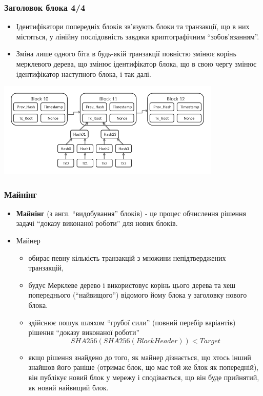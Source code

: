 \documentclass{beamer}
\begin{document}
\begin{frame}
  \frametitle{Заголовок блока 4/4}
  \begin{itemize}
  \item Ідентифікатори попередніх блоків зв'язують блоки та транзакції, що в них
    містяться, у лінійну послідовність завдяки криптографічним ``зобов'язанням''.
  \item Зміна лише одного біта в будь-якій транзакції повністю змінює корінь
    мерклевого дерева, що змінює ідентифікатор блока, що в свою чергу змінює
    ідентифікатор наступного блока, і так далі.
  \end{itemize}
  \begin{center}
    \includegraphics[width=0.8\textwidth]{block-chain}
  \end{center}
\end{frame}

\begin{frame}
  \frametitle{Майнінг}
  \begin{small}
    \begin{itemize}
    \item \textbf{Майнінг} (з англ. ``видобування'' блоків) - це процес обчислення
      рішення задачі ``доказу виконаної роботи'' для нових блоків.
    \item Майнер
      \begin{itemize}
      \item обирає певну кількість транзакцій з множини непідтверджених транзакцій,
      \item будує Мерклеве дерево і використовує корінь цього дерева та хеш
        попереднього (``найвищого'') відомого йому блока у заголовку нового блока.
      \item здійснює пошук шляхом ``грубої сили'' (повний перебір варіантів)
        рішення ``доказу виконаної роботи''
        $$SHA256(SHA256(BlockHeader)) < Target$$
      \item якщо рішення знайдено до того, як майнер дізнається, що хтось інший
        знайшов його раніше (отримає блок, що має той же блок як попередній),
        він публікує новий блок у мережу і сподівається, що він буде прийнятий, як
        новий найвищий блок.
      \end{itemize}
    \end{itemize}
  \end{small}
\end{frame}
\end{document}
